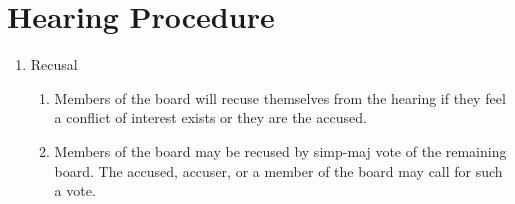 \section{Hearing Procedure}

	\begin{enumerate}
		\item Recusal
			\begin{enumerate}
				\item Members of the board will recuse themselves from the hearing if they feel a conflict of interest exists or they are the accused.
				\item Members of the board may be recused by \gls{simp-maj} vote of the remaining board. The accused, accuser, or a member of the board may call for such a vote.
			\end{enumerate}


\end{enumerate}
